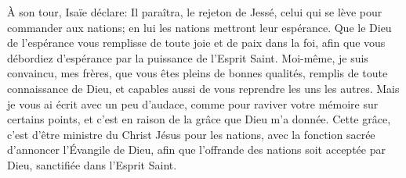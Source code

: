 À son tour, Isaïe déclare:
	Il paraîtra, le rejeton de Jessé,
	celui qui se lève pour commander aux nations;
	en lui les nations mettront leur espérance.
Que le Dieu de l’espérance vous remplisse de toute joie et de paix dans la foi,
	afin que vous débordiez d’espérance par la puissance de l’Esprit Saint.
Moi-même, je suis convaincu, mes frères,
		que vous êtes pleins de bonnes qualités,
	remplis de toute connaissance de Dieu,
	et capables aussi de vous reprendre les uns les autres.
Mais je vous ai écrit avec un peu d’audace,
	comme pour raviver votre mémoire sur certains points,
	et c’est en raison de la grâce que Dieu m’a donnée.
Cette grâce, c’est d’être ministre du Christ Jésus pour les nations,
	avec la fonction sacrée d’annoncer l’Évangile de Dieu,
	afin que l’offrande des nations soit acceptée par Dieu,
		sanctifiée dans l’Esprit Saint.
